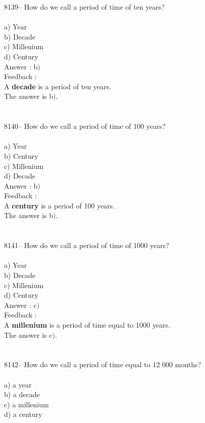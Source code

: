 \documentclass[letterpaper, 12pt]{article}
\begin{document}
8139-- How do we call a period of time of ten years?\\
\\
a) Year\\
b) Decade\\
c) Millenium\\
d) Century\\

Answer : b$)$\\

Feedback :\\
A \textbf{decade} is a period of ten years. \\
The answer is b$)$.\\
\\
\\
8140-- How do we call a period of time of 100 years?\\
\\
a) Year\\
b) Century\\
c) Millenium\\
d) Decade\\

Answer : b$)$\\

Feedback :\\
A \textbf{century} is a period of 100 years. \\
The answer is b$)$.\\
\\
\\
8141-- How do we call a period of time of 1000 years?\\
\\
a) Year\\
b) Decade\\
c) Millenium\\
d) Century\\

Answer : c$)$\\

Feedback :\\
A \textbf{millenium} is a period of time equal to 1000 years. \\
The answer is c$)$.\\
\\
\\
8142-- How do we call a period of time equal to 12 000 months?\\
\\
a) a year\\
b) a decade\\
c) a millenium\\
d) a century\\
\end{document}
